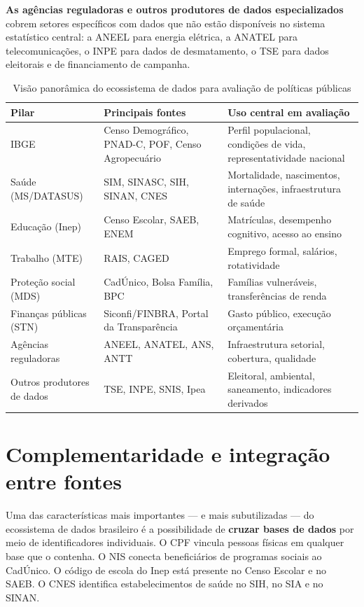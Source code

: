 \textbf{As agências reguladoras e outros produtores de dados especializados} cobrem setores específicos com dados que não estão disponíveis no sistema estatístico central: a ANEEL para energia elétrica, a ANATEL para telecomunicações, o INPE para dados de desmatamento, o TSE para dados eleitorais e de financiamento de campanha.

\begin{table}[H]
\centering
\caption{Visão panorâmica do ecossistema de dados para avaliação de políticas públicas}
\label{tab:ecossistema_geral}
\small
\begin{tabularx}{\textwidth}{@{} p{3.5cm} p{3cm} X @{}}
\toprule
\textbf{Pilar} & \textbf{Principais fontes} & \textbf{Uso central em avaliação} \\
\midrule
IBGE           & Censo Demográfico, PNAD-C, POF, Censo Agropecuário & Perfil populacional, condições de vida, representatividade nacional \\
Saúde (MS/DATASUS) & SIM, SINASC, SIH, SINAN, CNES & Mortalidade, nascimentos, internações, infraestrutura de saúde \\
Educação (Inep) & Censo Escolar, SAEB, ENEM & Matrículas, desempenho cognitivo, acesso ao ensino \\
Trabalho (MTE)  & RAIS, CAGED & Emprego formal, salários, rotatividade \\
Proteção social (MDS) & CadÚnico, Bolsa Família, BPC & Famílias vulneráveis, transferências de renda \\
Finanças públicas (STN) & Siconfi/FINBRA, Portal da Transparência & Gasto público, execução orçamentária \\
Agências reguladoras & ANEEL, ANATEL, ANS, ANTT & Infraestrutura setorial, cobertura, qualidade \\
Outros produtores de dados & TSE, INPE, SNIS, Ipea & Eleitoral, ambiental, saneamento, indicadores derivados \\
\bottomrule
\end{tabularx}
\end{table}

\section{Complementaridade e integração entre fontes}

Uma das características mais importantes --- e mais subutilizadas --- do ecossistema de dados brasileiro é a possibilidade de \textbf{cruzar bases de dados} por meio de identificadores individuais. O CPF vincula pessoas físicas em qualquer base que o contenha. O NIS conecta beneficiários de programas sociais ao CadÚnico. O código de escola do Inep está presente no Censo Escolar e no SAEB. O CNES identifica estabelecimentos de saúde no SIH, no SIA e no SINAN.

